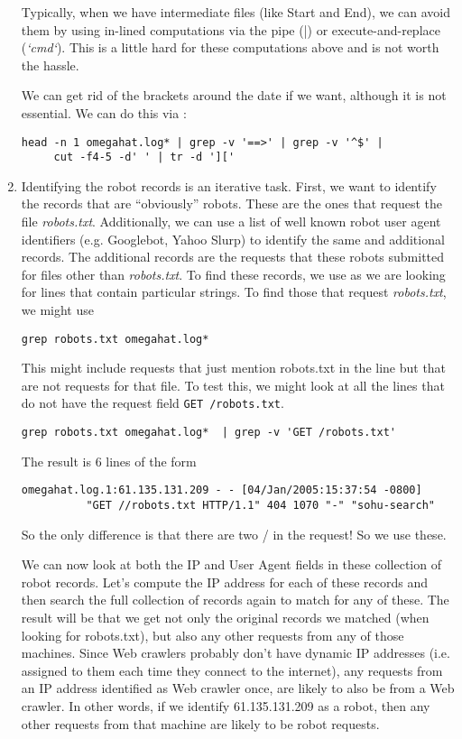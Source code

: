 \begin{enumerate}
Typically, when we have intermediate files (like Start and End),
we can avoid them by using in-lined computations via 
the pipe (|) or execute-and-replace (\textit{`cmd`}).
This is a little hard for these computations above
and is not worth the hassle.

We can get rid of the brackets around the date if we want,
although it is not essential.
We can do this via :
\begin{verbatim}
head -n 1 omegahat.log* | grep -v '==>' | grep -v '^$' |
     cut -f4-5 -d' ' | tr -d ']['
\end{verbatim}


\item
Identifying the robot records is an iterative task.
First, we want to identify the records that are ``obviously''
robots.  These are the ones that request the file
\textsl{robots.txt}.
Additionally,  we can use a list of well known robot
user agent identifiers (e.g. Googlebot, Yahoo Slurp)
to identify the same and additional  records.
The additional records are the requests that these robots
submitted for files other than \textsl{robots.txt}.
To find these records, we use 
as we are looking for lines that contain particular strings.
To find those that request \textsl{robots.txt}, we might use
\begin{verbatim}
grep robots.txt omegahat.log*
\end{verbatim}
This might include requests that just mention robots.txt in the line
but that are not requests for that file.
To test this, we might look at all the lines that do not have
the request field \texttt{GET /robots.txt}.
\begin{verbatim}
grep robots.txt omegahat.log*  | grep -v 'GET /robots.txt'
\end{verbatim}
The result is 6 lines of
the form
\begin{verbatim}
omegahat.log.1:61.135.131.209 - - [04/Jan/2005:15:37:54 -0800] 
          "GET //robots.txt HTTP/1.1" 404 1070 "-" "sohu-search"
\end{verbatim}
So the only difference is that there are two / in the request!
So we use these.

We can now look at both the IP and User Agent fields in these collection of robot records.
Let's compute the IP address for each of these records and then search the 
full collection of records again to match for any of these.
The result will be that we get
not only the original records we matched (when looking for robots.txt),
but also any other requests from any of those machines.  Since Web crawlers
probably don't  have dynamic IP addresses (i.e. assigned to them each time they connect to the
internet), any requests from an IP address identified as Web  crawler once, are likely
to also be from a Web crawler.
In other words, 
if we identify 61.135.131.209 as a robot, then 
any other requests from that machine are likely to be robot requests.


\end{enumerate}
